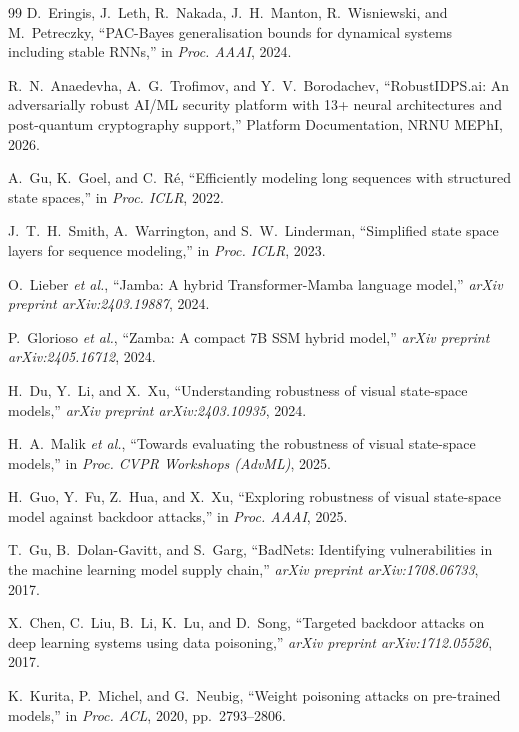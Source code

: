 \documentclass[12pt,a4paper]{article}
\theoremstyle{definition}
\theoremstyle{remark}
\begin{document}
\begin{thebibliography}{99}
D.~Eringis, J.~Leth, R.~Nakada, J.~H.~Manton, R.~Wisniewski, and M.~Petreczky, ``{PAC}-Bayes generalisation bounds for dynamical systems including stable RNNs,'' in \emph{Proc. AAAI}, 2024.


R.~N.~Anaedevha, A.~G.~Trofimov, and Y.~V.~Borodachev, ``{RobustIDPS.ai}: An adversarially robust AI/ML security platform with 13+ neural architectures and post-quantum cryptography support,'' Platform Documentation, NRNU MEPhI, 2026.

A.~Gu, K.~Goel, and C.~R\'e, ``Efficiently modeling long sequences with structured state spaces,'' in \emph{Proc. ICLR}, 2022.

J.~T.~H.~Smith, A.~Warrington, and S.~W.~Linderman, ``Simplified state space layers for sequence modeling,'' in \emph{Proc. ICLR}, 2023.

O.~Lieber \emph{et al.}, ``{Jamba}: A hybrid Transformer-Mamba language model,'' \emph{arXiv preprint arXiv:2403.19887}, 2024.

P.~Glorioso \emph{et al.}, ``{Zamba}: A compact 7B SSM hybrid model,'' \emph{arXiv preprint arXiv:2405.16712}, 2024.

H.~Du, Y.~Li, and X.~Xu, ``Understanding robustness of visual state-space models,'' \emph{arXiv preprint arXiv:2403.10935}, 2024.

H.~A.~Malik \emph{et al.}, ``Towards evaluating the robustness of visual state-space models,'' in \emph{Proc. CVPR Workshops (AdvML)}, 2025.

H.~Guo, Y.~Fu, Z.~Hua, and X.~Xu, ``Exploring robustness of visual state-space model against backdoor attacks,'' in \emph{Proc. AAAI}, 2025.


T.~Gu, B.~Dolan-Gavitt, and S.~Garg, ``{BadNets}: Identifying vulnerabilities in the machine learning model supply chain,'' \emph{arXiv preprint arXiv:1708.06733}, 2017.

X.~Chen, C.~Liu, B.~Li, K.~Lu, and D.~Song, ``Targeted backdoor attacks on deep learning systems using data poisoning,'' \emph{arXiv preprint arXiv:1712.05526}, 2017.

K.~Kurita, P.~Michel, and G.~Neubig, ``Weight poisoning attacks on pre-trained models,'' in \emph{Proc. ACL}, 2020, pp.~2793--2806.


\end{thebibliography}
\end{document}
